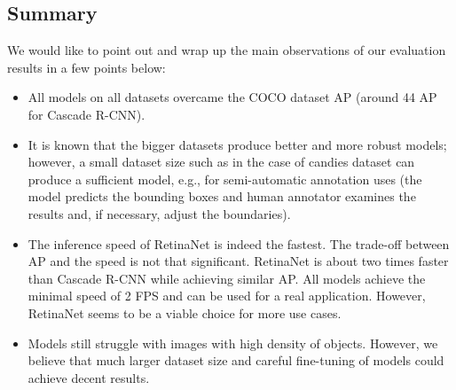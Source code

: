 \subsection*{Summary}
We would like to point out and wrap up the main observations of our evaluation
results in a few points below:
\begin{itemize}
	\item All models on all datasets overcame the COCO dataset AP (around 44 AP
	      for Cascade R-CNN).
	\item It is known that the bigger datasets produce better and more robust
	      models; however, a small dataset size such as in the case of candies dataset
	      can produce a sufficient model, e.g., for semi-automatic annotation uses
	      (the model predicts the bounding boxes and human annotator examines the
	      results and, if necessary, adjust the boundaries).
	\item The inference speed of RetinaNet is indeed the fastest. The
	      trade-off between AP and the speed is not that significant. RetinaNet
	      is about two times faster than Cascade R-CNN while achieving similar
	      AP. All models achieve the minimal speed of 2 FPS and can be used
	      for a real application. However, RetinaNet seems to be a viable
	      choice for more use cases.
	\item Models still struggle with images with high density of objects.
	      However, we believe that much larger dataset size and careful
	      fine-tuning of models could achieve decent results.
\end{itemize}




